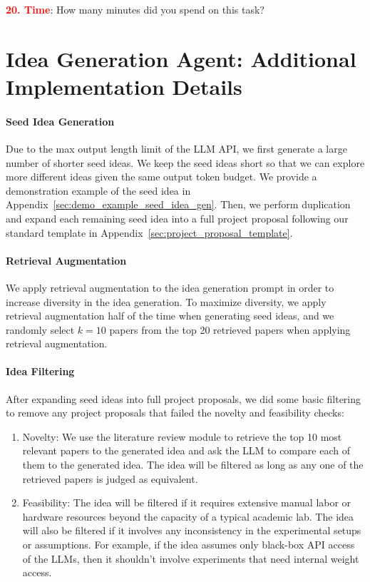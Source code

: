 \textbf{\textcolor{red}{20. Time}}: How many minutes did you spend on this task?


\newpage







\section{Idea Generation Agent: Additional Implementation Details}
\label{sec:agent_details}

\paragraph{Seed Idea Generation} 
Due to the max output length limit of the LLM API, we first generate a large number of shorter seed ideas. 
We keep the seed ideas short so that we can explore more different ideas given the same output token budget. 
We provide a demonstration example of the seed idea in Appendix~\ref{sec:demo_example_seed_idea_gen}.
Then, we perform duplication and expand each remaining seed idea into a full project proposal following our standard template in Appendix~\ref{sec:project_proposal_template}.

\paragraph{Retrieval Augmentation} We apply retrieval augmentation to the idea generation prompt in order to increase diversity in the idea generation. To maximize diversity, we apply retrieval augmentation half of the time when generating seed ideas, and we randomly select $k = 10$ papers from the top 20 retrieved papers when applying retrieval augmentation. 


\paragraph{Idea Filtering}
After expanding seed ideas into full project proposals, we did some basic filtering to remove any project proposals that failed the novelty and feasibility checks:

\begin{enumerate}
    \item Novelty: We use the literature review module to retrieve the top 10 most relevant papers to the generated idea and ask the LLM to compare each of them to the generated idea. The idea will be filtered as long as any one of the retrieved papers is judged as equivalent. 

    \item Feasibility: The idea will be filtered if it requires extensive manual labor or hardware resources beyond the capacity of a typical academic lab. The idea will also be filtered if it involves any inconsistency in the experimental setups or assumptions. For example, if the idea assumes only black-box API access of the LLMs, then it shouldn't involve experiments that need internal weight access. 
\end{enumerate}

